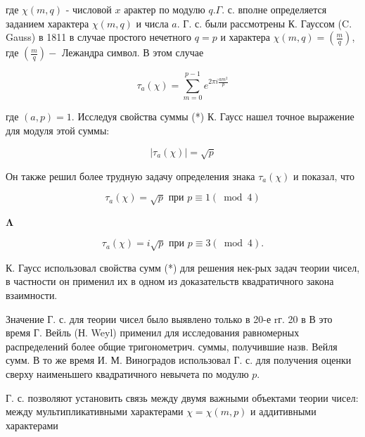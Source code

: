 \documentclass[10pt]{article}
\begin{document}
где $\chi(m, q)$ - числовой $x$ арактер по модулю $q . \Gamma$. с. вполне определяется заданием характера $\chi(m, q)$ и числа $a$. Г. с. были рассмотрены К. Гауссом (C. Gauss) в 1811 в случае простого нечетного $q=p$ и характера $\chi(m, q)=\left(\frac{m}{q}\right)$, где $\left(\frac{m}{q}\right)-$ Лежандра символ. В этом случае



\[

\tau_{a}(\chi)=\sum_{m=0}^{p-1} e^{2 \pi i \frac{a m^{2}}{p}}

\]



где $(a, p)=1$. Исследуя свойства суммы (*) К. Гаусс нашел точное выражение для модуля этой суммы:



\[

\left|\tau_{a}(\chi)\right|=\sqrt{p}

\]



Он также решил более трудную задачу определения знака $\tau_{a}(\chi)$ и показал, что



\[

\tau_{a}(\chi)=\sqrt{p} \text { при } p \equiv 1(\bmod 4)

\]



$\mathbf{\Lambda}$



\[

\tau_{a}(\chi)=i \sqrt{p} \text { при } p \equiv 3(\bmod 4) .

\]



К. Гаусс использовал свойства сумм (*) для решения нек-рых задач теории чисел, в частности он применил их в одном из доказательств квадратичного закона взаимности.



Значение Г. с. для теории чисел было выявлено только в 20-е rг. 20 в В это время Г. Вейль (Н. Weyl) применил для исследования равномерных распределений более общие тригонометрич. суммы, получившие назв. Вейля сумм. В то же время И. М. Виноградов использовал Г. с. для получения оценки сверху наименьшего квадратичного невычета по модулю $p$.



Г. с. позволяют установить связь между двумя важными объектами теории чисел: между мультипликативными характерами $\chi=\chi(m, p)$ и аддитивными характерами
\end{document}
